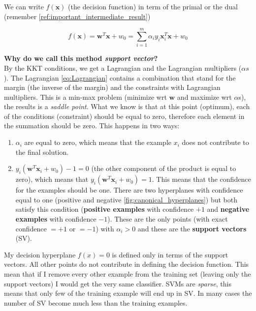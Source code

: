 We can write $f(\pmb{x})$ (the decision function) in term of the primal or the
dual (remember \ref{ref:important_intermediate_result})

\[
	f(\pmb{x}) = \pmb{w}^{T}\pmb{x}+ w_{0}= \sum_{i=1}^{m}\alpha_{i}y_{i}\pmb{x}_{i}
	^{T}\pmb{x}+ w_{0}
\]

\textbf{Why do we call this method \textit{support vector}?}\\ By the KKT
conditions, we get a Lagrangian and the Lagrangian multipliers ($\alpha s$). The
Lagrangian \ref{eq:Lagrangian} contains a combination that stand for the margin
(the inverse of the margin) and the constraints with Lagrangian multipliers. This
is a min-max problem (minimize wrt $\pmb{w}$ and maximize wrt $\alpha$s), the results
is a \textit{saddle point}. What we know is that at this point (optimum), each
of the conditions (constraint) should be equal to zero, therefore each element in
the summation should be zero. This happens in two ways:
\begin{enumerate}
	\item $\alpha_{i}$ are equal to zero, which means that the example $x_{i}$
		does not contribute to the final solution.

	\item $y_{i}(\pmb{w}^{T}\pmb{x}_{i}+ w_{0}) - 1 = 0$ (the other component of
		the product is equal to zero), which means that
		$y_{i}(\pmb{w}^{T}\pmb{x}_{i}+ w_{0}) = 1$. This means that the confidence for
		the examples should be one. There are two hyperplanes with confidence equal
		to one (positive and negative \ref{fig:canonical_hyperplanes}) but both
		satisfy this condition (\textbf{positive examples} with confidence $+1$ and
		\textbf{negative examples} with confidence $-1$). These are the only points (with
		exact confidence $=+1$ or $=-1$) with $\alpha_{i}> 0$ and these are the \textbf{support
		vectors} (SV).
\end{enumerate}
My decision hyperplane $f(x) = 0$ is defined only in terms of the support vectors.
All other points do not contribute in defining the decision function. This mean that
if I remove every other example from the training set (leaving only the support
vectors) I would get the very same classifier. SVMs are \textit{sparse}, this
means that only few of the training example will end up in SV. In many cases the
number of SV become much less than the training examples.\\

